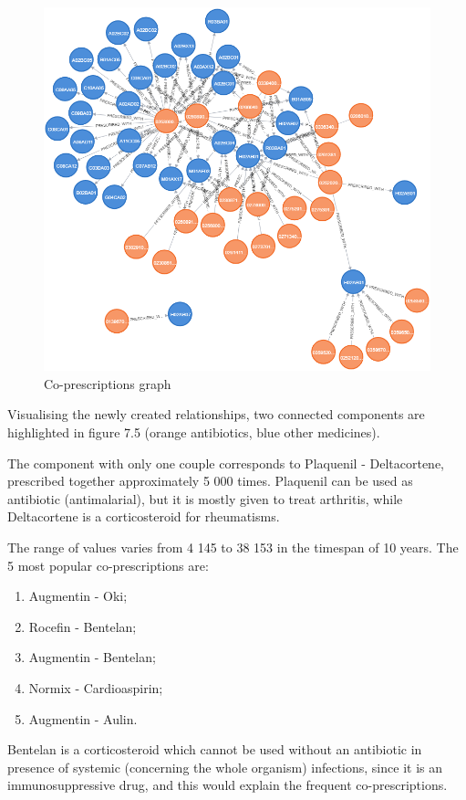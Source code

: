 \begin{figure}[h]
	\centering
	\includegraphics[scale=0.4]{./images/couples-graph.png}
	\caption{\small Co-prescriptions graph}
\end{figure}

Visualising the newly created relationships, two connected components are highlighted in figure 7.5 (orange antibiotics, blue other medicines).

\newpage
The component with only one couple corresponds to Plaquenil - Deltacortene, prescribed together approximately 5 000 times. Plaquenil can be used as antibiotic (antimalarial), but it is mostly given to treat arthritis, while Deltacortene is a corticosteroid for rheumatisms. 

The range of values varies from 4 145 to 38 153 in the timespan of 10 years. The 5 most popular co-prescriptions are:
\begin{enumerate}
	\item Augmentin - Oki;
	\item Rocefin - Bentelan;
	\item Augmentin - Bentelan;
	\item Normix - Cardioaspirin;
	\item Augmentin - Aulin.
\end{enumerate}

Bentelan is a corticosteroid which cannot be used without an antibiotic in presence of systemic (concerning the whole organism) infections, since it is an immunosuppressive drug, and this would explain the frequent co-prescriptions.

